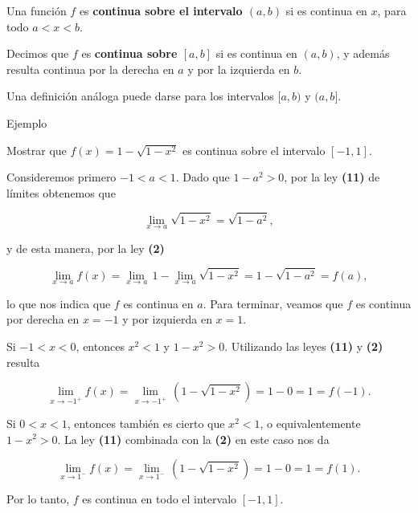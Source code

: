 \documentclass[
  letterpaper,
]{book}
\theoremstyle{plain}
\theoremstyle{remark}
\begin{document}
\begin{tcolorbox}[enhanced jigsaw, opacityback=0, left=2mm, opacitybacktitle=0.6, toprule=.15mm, bottomrule=.15mm, colbacktitle=quarto-callout-note-color!10!white, titlerule=0mm, bottomtitle=1mm, title=\textcolor{quarto-callout-note-color}{\faInfo}\hspace{0.5em}{Definición (continuidad en un intervalo)}, toptitle=1mm, colframe=quarto-callout-note-color-frame, colback=white, breakable, rightrule=.15mm, arc=.35mm, leftrule=.75mm, coltitle=black]

Una función \(f\) es \textbf{continua sobre el intervalo \((a,b)\)} si
es continua en \(x\), para todo \(a<x<b\).

Decimos que \(f\) es \textbf{continua sobre \([a,b]\)} si es continua en
\((a,b)\), y además resulta continua por la derecha en \(a\) y por la
izquierda en \(b\).

\end{tcolorbox}

Una definición análoga puede darse para los intervalos \([a,b)\) y
\((a,b]\).

Ejemplo

Mostrar que \(f(x)=1-\sqrt{1-x^2}\) es continua sobre el intervalo
\([-1,1]\).

\begin{tcolorbox}[enhanced jigsaw, opacityback=0, left=2mm, opacitybacktitle=0.6, toprule=.15mm, bottomrule=.15mm, colbacktitle=quarto-callout-tip-color!10!white, titlerule=0mm, bottomtitle=1mm, title=\textcolor{quarto-callout-tip-color}{\faLightbulb}\hspace{0.5em}{Solución}, toptitle=1mm, colframe=quarto-callout-tip-color-frame, colback=white, breakable, rightrule=.15mm, arc=.35mm, leftrule=.75mm, coltitle=black]

Consideremos primero \(-1<a<1\). Dado que \(1-a^2>0\), por la ley
\textbf{(11)} de límites obtenemos que

\[
\lim_{x\to a} \sqrt{1-x^2}=\sqrt{1-a^2},
\]

y de esta manera, por la ley \textbf{(2)}

\[
\lim_{x\to a} f(x)=\lim_{x\to a}\,1 -\lim_{x\to a} \sqrt{1-x^2}=1-\sqrt{1-a^2}=f(a),
\]

lo que nos indica que \(f\) es continua en \(a\). Para terminar, veamos
que \(f\) es continua por derecha en \(x=-1\) y por izquierda en
\(x=1\).

Si \(-1<x<0\), entonces \(x^2<1\) y \(1-x^2>0\). Utilizando las leyes
\textbf{(11)} y \textbf{(2)} resulta

\[
\lim_{x\to -1^+} f(x)=\lim_{x\to -1^+} \,\left(1-\sqrt{1-x^2}\right)=1-0=1=f(-1).
\]

Si \(0<x<1\), entonces también es cierto que \(x^2<1\), o
equivalentemente \(1-x^2>0\). La ley \textbf{(11)} combinada con la
\textbf{(2)} en este caso nos da

\[
\lim_{x\to 1^-} f(x)=\lim_{x\to 1^-} \,\left(1-\sqrt{1-x^2}\right)=1-0=1=f(1).
\]

Por lo tanto, \(f\) es continua en todo el intervalo \([-1,1]\).

\end{tcolorbox}
\end{document}
